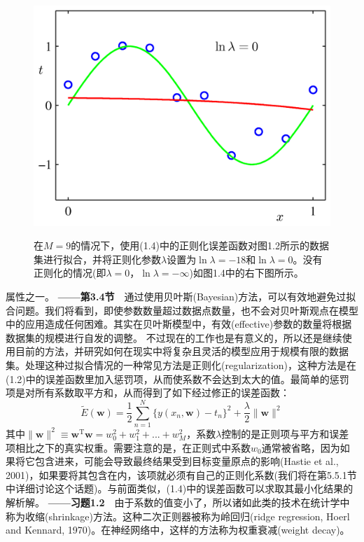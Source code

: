 \documentclass[b5paper]{book}
\numberwithin{equation}{chapter}
\begin{document}
{\begin{figure}[H]
		\begin{minipage}[t]{0.5\linewidth}
		\includegraphics[scale=0.8]{Images/1-7b.png}
		\label{fig:1-7b}
		\end{minipage}
		\caption{在$M=9$的情况下，使用(1.4)中的正则化误差函数对图1.2所示的数据集进行拟合，并将正则化参数$\lambda$设置为$\ln \lambda = -18$和$\ln \lambda = 0$。没有正则化的情况(即$\lambda=0$，$\ln \lambda = -\infty$)如图1.4中的右下图所示。}
	\end{figure}
	\noindent 属性之一。\color{red} \textbf{——第3.4节}　\color{black}通过使用贝叶斯(Bayesian)方法，可以有效地避免过拟合问题。我们将看到，即使参数数量超过数据点数量，也不会对贝叶斯观点在模型中的应用造成任何困难。其实在贝叶斯模型中，有效(effective)参数的数量将根据数据集的规模进行自发的调整。
	\indent 不过现在的工作也是有意义的，所以还是继续使用目前的方法，并研究如何在现实中将复杂且灵活的模型应用于规模有限的数据集。处理这种过拟合情况的一种常见方法是正则化(regularization)，这种方法是在(1.2)中的误差函数里加入惩罚项，从而使系数不会达到太大的值。最简单的惩罚项是对所有系数取平方和，从而得到了如下经过修正的误差函数：
	\begin{equation}
		\widetilde{E}(\mathbf{w})=\frac{1}{2}\sum_{n=1}^{N} \{ y(x_n,\mathbf{w}) - t_n\}^2 + \frac{\lambda}{2} \| \mathbf{w} \|^2
	\end{equation}
	其中$\| \mathbf{w} \|^2 \equiv \mathbf{w^\mathrm{T} w} = w_0^2 + w_1^2 + ... + w_M^2$，系数$\lambda$控制的是正则项与平方和误差项相比之下的真实权重。需要注意的是，在正则式中系数$w_0$通常被省略，因为如果将它包含进来，可能会导致最终结果受到目标变量原点的影响(Hastie et al., 2001)，如果要将其包含在内，该项就必须有自己的正则化系数(我们将在第5.5.1节中详细讨论这个话题)。与前面类似，(1.4)中的误差函数可以求取其最小化结果的解析解。\color{red} \textbf{——习题1.2}　\color{black}由于系数的值变小了，所以诸如此类的技术在统计学中称为收缩(shrinkage)方法。这种二次正则器被称为岭回归(ridge regression, Hoerl and Kennard, 1970)。在神经网络中，这样的方法称为权重衰减(weight decay)。 \\
}
\end{document}
